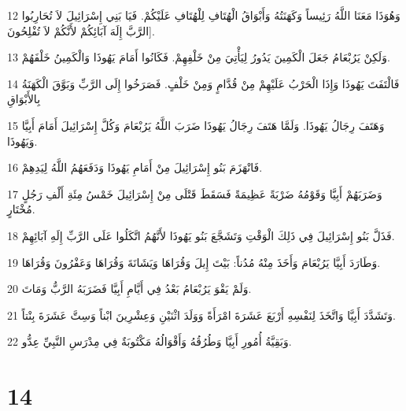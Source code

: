 \par 12 وَهُوَذَا مَعَنَا اللَّهُ رَئِيساً وَكَهَنَتُهُ وَأَبْوَاقُ الْهُتَافِ لِلْهُتَافِ عَلَيْكُمْ. فَيَا بَنِي إِسْرَائِيلَ لاَ تُحَارِبُوا الرَّبَّ إِلَهَ آبَائِكُمْ لأَنَّكُمْ لاَ تُفْلِحُونَ].
\par 13 وَلَكِنْ يَرُبْعَامُ جَعَلَ الْكَمِينَ يَدُورُ لِيَأْتِيَ مِنْ خَلْفِهِمْ. فَكَانُوا أَمَامَ يَهُوذَا وَالْكَمِينُ خَلْفَهُمْ.
\par 14 فَالْتَفَتَ يَهُوذَا وَإِذَا الْحَرْبُ عَلَيْهِمْ مِنْ قُدَّامٍ وَمِنْ خَلْفٍ. فَصَرَخُوا إِلَى الرَّبِّ وَبَوَّقَ الْكَهَنَةُ بِالأَبْوَاقِ
\par 15 وَهَتَفَ رِجَالُ يَهُوذَا. وَلَمَّا هَتَفَ رِجَالُ يَهُوذَا ضَرَبَ اللَّهُ يَرُبْعَامَ وَكُلَّ إِسْرَائِيلَ أَمَامَ أَبِيَّا وَيَهُوذَا.
\par 16 فَانْهَزَمَ بَنُو إِسْرَائِيلَ مِنْ أَمَامِ يَهُوذَا وَدَفَعَهُمُ اللَّهُ لِيَدِهِمْ.
\par 17 وَضَرَبَهُمْ أَبِيَّا وَقَوْمُهُ ضَرْبَةً عَظِيمَةً فَسَقَطَ قَتْلَى مِنْ إِسْرَائِيلَ خَمْسُ مِئَةِ أَلْفِ رَجُلٍ مُخْتَارٍ.
\par 18 فَذَلَّ بَنُو إِسْرَائِيلَ فِي ذَلِكَ الْوَقْتِ وَتَشَجَّعَ بَنُو يَهُوذَا لأَنَّهُمُ اتَّكَلُوا عَلَى الرَّبِّ إِلَهِ آبَائِهِمْ.
\par 19 وَطَارَدَ أَبِيَّا يَرُبْعَامَ وَأَخَذَ مِنْهُ مُدُناً: بَيْتَ إِيلَ وَقُرَاهَا وَيَشَانَةَ وَقُرَاهَا وَعَفْرُونَ وَقُرَاهَا.
\par 20 وَلَمْ يَقْوَ يَرُبْعَامُ بَعْدُ فِي أَيَّامِ أَبِيَّا فَضَرَبَهُ الرَّبُّ وَمَاتَ.
\par 21 وَتَشَدَّدَ أَبِيَّا وَاتَّخَذَ لِنَفْسِهِ أَرْبَعَ عَشَرَةَ امْرَأَةً وَوَلَدَ اثْنَيْنِ وَعِشْرِينَ ابْناً وَسِتَّ عَشَرَةَ بِنْتاً.
\par 22 وَبَقِيَّةُ أُمُورِ أَبِيَّا وَطُرُقُهُ وَأَقْوَالُهُ مَكْتُوبَةٌ فِي مِدْرَسِ النَّبِيِّ عِدُّو.

\chapter{14}


